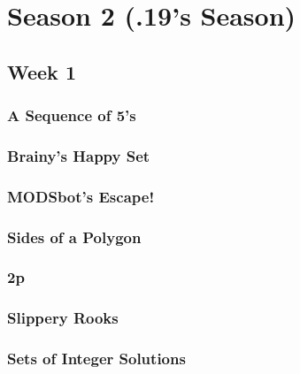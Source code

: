 \documentclass[titlepage=true]{scrartcl}
\begin{document}
\section{Season 2 (.19's Season)}

    \subsection{Week 1}

        \subsubsection{A Sequence of 5's}
            \label{2-1-1}
            
        \newpage

        \subsubsection{Brainy's Happy Set}
            \label{2-1-2}
            
        \newpage
       
        \subsubsection{MODSbot's Escape!}
            \label{2-1-3}
                    
        \newpage 

        \subsubsection{Sides of a Polygon}
            \label{2-1-4}
            
        \newpage 

        \subsubsection{2p}
            \label{2-1-5}
            
        \newpage

        \subsubsection{Slippery Rooks}
            \label{2-1-6}
            
        \newpage
            
        \subsubsection{Sets of Integer Solutions}
            \label{2-1-7}
                    
        \newpage 
\end{document}
